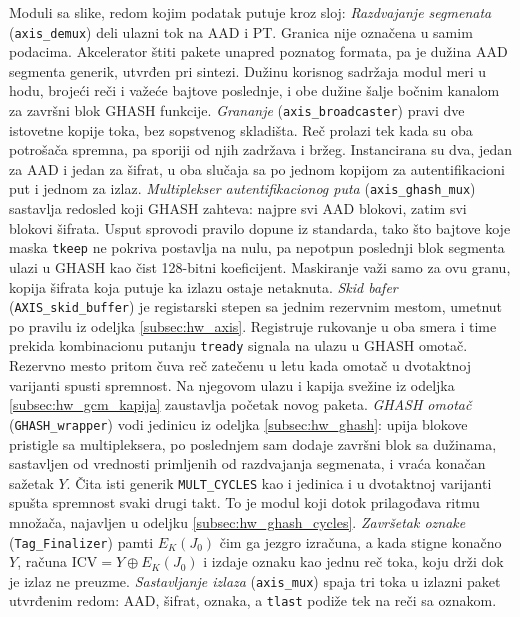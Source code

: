 Moduli sa slike, redom kojim podatak putuje kroz sloj:
\smallbreak
\textit{Razdvajanje segmenata} (\texttt{axis\_demux}) deli ulazni tok na AAD i PT. Granica nije označena u samim podacima. Akcelerator štiti pakete unapred poznatog formata, pa je dužina AAD segmenta generik, utvrđen pri sintezi. Dužinu korisnog sadržaja modul meri u hodu, brojeći reči i važeće bajtove poslednje, i obe dužine šalje bočnim kanalom za završni blok GHASH funkcije.
\smallbreak
\textit{Grananje} (\texttt{axis\_broadcaster}) pravi dve istovetne kopije toka, bez sopstvenog skladišta. Reč prolazi tek kada su oba potrošača spremna, pa sporiji od njih zadržava i bržeg. Instancirana su dva, jedan za AAD i jedan za šifrat, u oba slučaja sa po jednom kopijom za autentifikacioni put i jednom za izlaz.
\smallbreak
\textit{Multiplekser autentifikacionog puta} (\texttt{axis\_ghash\_mux}) sastavlja redosled koji GHASH zahteva: najpre svi AAD blokovi, zatim svi blokovi šifrata. Usput sprovodi pravilo dopune iz standarda, tako što bajtove koje maska \texttt{tkeep} ne pokriva postavlja na nulu, pa nepotpun poslednji blok segmenta ulazi u GHASH kao čist 128-bitni koeficijent. Maskiranje važi samo za ovu granu, kopija šifrata koja putuje ka izlazu ostaje netaknuta.
\smallbreak
\textit{Skid bafer} (\texttt{AXIS\_skid\_buffer}) je registarski stepen sa jednim rezervnim mestom, umetnut po pravilu iz odeljka \ref{subsec:hw_axis}. Registruje rukovanje u oba smera i time prekida kombinacionu putanju \texttt{tready} signala na ulazu u GHASH omotač. Rezervno mesto pritom čuva reč zatečenu u letu kada omotač u dvotaktnoj varijanti spusti spremnost. Na njegovom ulazu i kapija svežine iz odeljka \ref{subsec:hw_gcm_kapija} zaustavlja početak novog paketa.
\smallbreak
\textit{GHASH omotač} (\texttt{GHASH\_wrapper}) vodi jedinicu iz odeljka \ref{subsec:hw_ghash}: upija blokove pristigle sa multipleksera, po poslednjem sam dodaje završni blok sa dužinama, sastavljen od vrednosti primljenih od razdvajanja segmenata, i vraća konačan sažetak $Y$. Čita isti generik \texttt{MULT\_CYCLES} kao i jedinica i u dvotaktnoj varijanti spušta spremnost svaki drugi takt. To je modul koji dotok prilagođava ritmu množača, najavljen u odeljku \ref{subsec:hw_ghash_cycles}.
\smallbreak
\textit{Završetak oznake} (\texttt{Tag\_Finalizer}) pamti $E_K(J_0)$ čim ga jezgro izračuna, a kada stigne konačno $Y$, računa $\mathrm{ICV} = Y \oplus E_K(J_0)$ i izdaje oznaku kao jednu reč toka, koju drži dok je izlaz ne preuzme.
\smallbreak
\textit{Sastavljanje izlaza} (\texttt{axis\_mux}) spaja tri toka u izlazni paket utvrđenim redom: AAD, šifrat, oznaka, a \texttt{tlast} podiže tek na reči sa oznakom.

